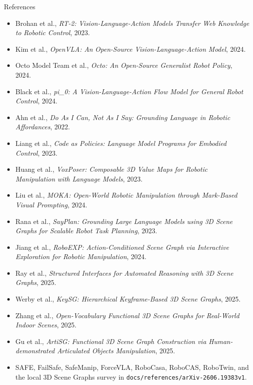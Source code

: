\begin{frame}{References}
\scriptsize
\begin{itemize}
\item Brohan et al., \textit{RT-2: Vision-Language-Action Models Transfer Web Knowledge to Robotic Control}, 2023.
\item Kim et al., \textit{OpenVLA: An Open-Source Vision-Language-Action Model}, 2024.
\item Octo Model Team et al., \textit{Octo: An Open-Source Generalist Robot Policy}, 2024.
\item Black et al., \textit{pi\_0: A Vision-Language-Action Flow Model for General Robot Control}, 2024.
\item Ahn et al., \textit{Do As I Can, Not As I Say: Grounding Language in Robotic Affordances}, 2022.
\item Liang et al., \textit{Code as Policies: Language Model Programs for Embodied Control}, 2023.
\item Huang et al., \textit{VoxPoser: Composable 3D Value Maps for Robotic Manipulation with Language Models}, 2023.
\item Liu et al., \textit{MOKA: Open-World Robotic Manipulation through Mark-Based Visual Prompting}, 2024.
\item Rana et al., \textit{SayPlan: Grounding Large Language Models using 3D Scene Graphs for Scalable Robot Task Planning}, 2023.
\item Jiang et al., \textit{RoboEXP: Action-Conditioned Scene Graph via Interactive Exploration for Robotic Manipulation}, 2024.
\item Ray et al., \textit{Structured Interfaces for Automated Reasoning with 3D Scene Graphs}, 2025.
\item Werby et al., \textit{KeySG: Hierarchical Keyframe-Based 3D Scene Graphs}, 2025.
\item Zhang et al., \textit{Open-Vocabulary Functional 3D Scene Graphs for Real-World Indoor Scenes}, 2025.
\item Gu et al., \textit{ArtiSG: Functional 3D Scene Graph Construction via Human-demonstrated Articulated Objects Manipulation}, 2025.
\item SAFE, FailSafe, SafeManip, ForceVLA, RoboCasa, RoboCAS, RoboTwin, and the local 3D Scene Graphs survey in \texttt{docs/references/arXiv-2606.19383v1}.
\end{itemize}
\end{frame}
